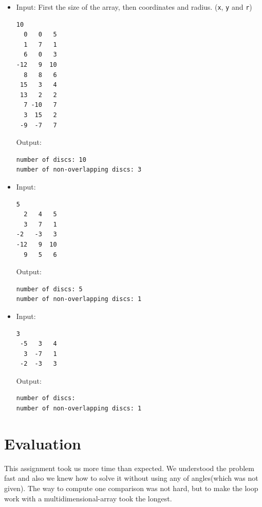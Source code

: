 \documentclass[a4paper,10pt]{article}
\begin{document}
\begin{itemize}

\item Input: First the size of the array, then coordinates and radius. ({\tt x}, {\tt y} and {\tt r})
\begin{lstlisting}[style = stdio]
10
  0   0   5
  1   7   1
  6   0   3
-12   9  10
  8   8   6
 15   3   4
 13   2   2
  7 -10   7
  3  15   2
 -9  -7   7
\end{lstlisting}

  Output:
\begin{lstlisting}[style = stdio]
number of discs: 10
number of non-overlapping discs: 3
\end{lstlisting}


\item Input:
\begin{lstlisting}[style = stdio]
5
  2   4   5
  3   7   1
-2   -3   3
-12   9  10
  9   5   6
\end{lstlisting}

  Output:
\begin{lstlisting}[style = stdio]
number of discs: 5
number of non-overlapping discs: 1
\end{lstlisting}


\item Input: 
\begin{lstlisting}[style = stdio]
3
 -5   3   4
  3  -7   1
 -2  -3   3
\end{lstlisting}

  Output:
\begin{lstlisting}[style = stdio]
number of discs: 
number of non-overlapping discs: 1
\end{lstlisting}

\end{itemize}

\section{Evaluation}
This assignment took us more time than expected. We understood the problem fast and also we knew how to solve it without using any  of angles(which was not given). The way to compute one comparison was not hard, but to make the loop work with a multidimensional-array took the longest.   
\end{document}
